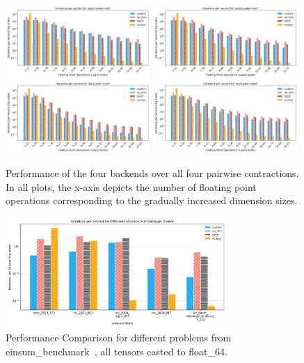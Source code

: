 \begin{figure}[H]
    \caption{Performance of the four backends over all four pairwise contractions. In all plots, the x-axis depicts the number of floating point operations corresponding to the gradually increased dimension sizes. }
    \label{figure_all}
    \centering
    \includegraphics[width=0.49\textwidth]{images/aabcd_adeef__dcf.png} 
    \includegraphics[width=0.49\textwidth]{images/aabcd_adeef__bcf.png} \\
    \includegraphics[width=0.49\textwidth]{images/abcd_adef__cbef.png}
    \includegraphics[width=0.49\textwidth]{images/abcd_adef__dbef.png}
    
\end{figure}

\begin{figure}[H]
    \caption{Performance Comparison for different problems from einsum\_benchmark~\cite{blacher2024einsum}, all tensors casted to float\_64.}
    \label{figure_double}
    \centering
    \includegraphics[width=0.75\textwidth]{images/Datatype_Double.png}  %
    
\end{figure}


